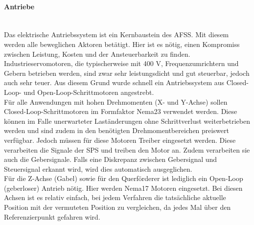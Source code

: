 \paragraph{Antriebe}\mbox{}\\
Das elektrische Antriebssystem ist ein Kernbaustein des AFSS. Mit diesem werden alle beweglichen Aktoren betätigt. Hier ist es nötig, einen Kompromiss zwischen Leistung, Kosten und der Ansteuerbarkeit zu finden.
\\
Industrieservomotoren, die typischerweise mit 400 V, Frequenzumrichtern und Gebern betrieben werden, sind zwar sehr leistungsdicht und gut steuerbar, jedoch auch sehr teuer. Aus diesem Grund wurde schnell ein Antriebssystem aus Closed-Loop- und Open-Loop-Schrittmotoren angestrebt.
\\
Für alle Anwendungen mit hohen Drehmomenten (X- und Y-Achse) sollen Closed-Loop-Schrittmotoren im Formfaktor Nema23 verwendet werden. Diese können im Falle unerwarteter Laständerungen ohne Schrittverlust weiterbetrieben werden und sind zudem in den benötigten Drehmomentbereichen preiswert verfügbar. Jedoch müssen für diese Motoren Treiber eingesetzt werden. Diese verarbeiten die Signale der SPS und treiben den Motor an. Zudem verarbeiten sie auch die Gebersignale. Falls eine Diskrepanz zwischen Gebersignal und Steuersignal erkannt wird, wird dies automatisch ausgeglichen.
\\
Für die Z-Achse (Gabel) sowie für den Querförderer ist lediglich ein Open-Loop (geberloser) Antrieb nötig. Hier werden Nema17 Motoren eingesetzt. Bei diesen Achsen ist es relativ einfach, bei jedem Verfahren die tatsächliche aktuelle Position mit der vermuteten Position zu vergleichen, da jedes Mal über den Referenzierpunkt gefahren wird.

